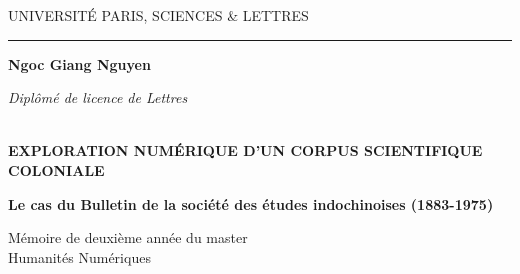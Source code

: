 \begin{titlepage}
\begin{center}

\bigskip

\begin{large}
UNIVERSITÉ PARIS, SCIENCES \& LETTRES
\end{large}

\begin{center}\rule{2cm}{0.02cm}\end{center}

\bigskip
\bigskip
\bigskip
\begin{Large}
\textbf{Ngoc Giang Nguyen}\\
\end{Large}
\begin{normalsize}
\textit{Diplômé de licence de Lettres}\\
\textit{}\\
\end{normalsize}

\bigskip
\bigskip
\bigskip

\begin{Huge}
\textbf{EXPLORATION NUMÉRIQUE 
D’UN CORPUS SCIENTIFIQUE COLONIALE}\\
\end{Huge}

\bigskip
\bigskip
\begin{LARGE}
\textbf{Le cas du
Bulletin de la société des études indochinoises (1883-1975)}\\
\end{LARGE}

\bigskip
\bigskip
\bigskip
\vfill

\begin{large}
Mémoire de deuxième année du master\\
\og Humanités Numériques \fg{} \\
\end{large}

\end{center}
\end{titlepage}
